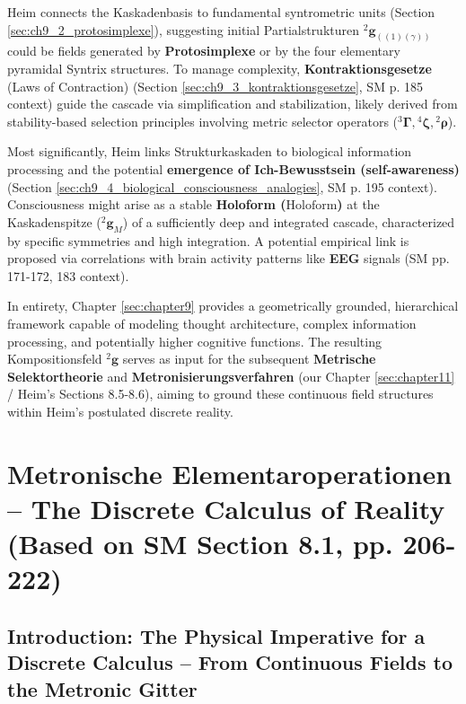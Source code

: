 \documentclass[
    12pt,              %
    a4paper,           %
    headings=normal,   %
    twoside=true,      %
    BCOR=8mm,          %
]{scrbook}
\newcommand{\holoform}{\text{Holoform}}
\newcommand{\kompositionsfeld}{{}^2\mathbf{g}}
\newcommand{\partialstruktur}[1]{{}^2\mathbf{g}_{(#1)}}
\newcommand{\fundamentalkondensor}{{}^3\bm{\Gamma}}
\newcommand{\strukturkompressor}{{}^4\bm{\zeta}}
\begin{document}
Heim connects the Kaskadenbasis to fundamental syntrometric units (Section \ref{sec:ch9_2_protosimplexe}), suggesting initial Partialstrukturen \(\partialstruktur{(1)(\gamma)}\) could be fields generated by \textbf{Protosimplexe} or by the four elementary pyramidal Syntrix structures. To manage complexity, \textbf{Kontraktionsgesetze} (Laws of Contraction) (Section \ref{sec:ch9_3_kontraktionsgesetze}, SM p. 185 context) guide the cascade via simplification and stabilization, likely derived from stability-based selection principles involving metric selector operators (\(\fundamentalkondensor, \strukturkompressor, {}^2\bm{\rho}\)).

Most significantly, Heim links Strukturkaskaden to biological information processing and the potential \textbf{emergence of Ich-Bewusstsein (self-awareness)} (Section \ref{sec:ch9_4_biological_consciousness_analogies}, SM p. 195 context). Consciousness might arise as a stable \textbf{Holoform (\(\holoform\))} at the Kaskadenspitze (\(\kompositionsfeld_M\)) of a sufficiently deep and integrated cascade, characterized by specific symmetries and high integration. A potential empirical link is proposed via correlations with brain activity patterns like \textbf{EEG} signals (SM pp. 171-172, 183 context).

In entirety, Chapter \ref{sec:chapter9} provides a geometrically grounded, hierarchical framework capable of modeling thought architecture, complex information processing, and potentially higher cognitive functions. The resulting Kompositionsfeld \(\kompositionsfeld\) serves as input for the subsequent \textbf{Metrische Selektortheorie} and \textbf{Metronisierungsverfahren} (our Chapter \ref{sec:chapter11} / Heim's Sections 8.5-8.6), aiming to ground these continuous field structures within Heim’s postulated discrete reality.

\clearpage

\chapter{Metronische Elementaroperationen – The Discrete Calculus of Reality (Based on SM Section 8.1, pp. 206-222)}
\label{sec:chapter10} %

\section{Introduction: The Physical Imperative for a Discrete Calculus – From Continuous Fields to the Metronic Gitter}
\label{sec:ch10_0_intro}
\end{document}
